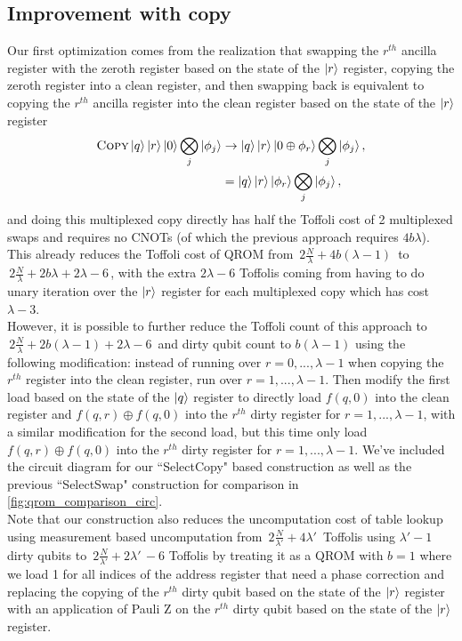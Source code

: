 \documentclass[a4paper, amsfonts, amssymb, amsmath, reprint, showkeys, twoside,superscriptaddress, onecolumn, nofootinbib]{revtex4-2}
\begin{document}
\subsection{Improvement with copy}\label{sec:select_copy}
Our first optimization comes from the realization that swapping the $r^{th}$ ancilla register with the zeroth register based on the state of the $\ket{r}$ register, copying the zeroth register into a clean register, and then swapping back is equivalent to copying the $r^{th}$ ancilla register into the clean register based on the state of the $\ket{r}$ register
\begin{align}
    \textsc{Copy}\ket{q}\ket{r}\ket{0}\bigotimes_j \ket{\phi_j}  &\to \ket{q}\ket{r}\ket{0\oplus\phi_r}\bigotimes_j \ket{\phi_j},\nonumber\\
    &= \ket{q}\ket{r}\ket{\phi_r}\bigotimes_j \ket{\phi_j},
\end{align}
and doing this multiplexed copy directly has half the Toffoli cost of 2 multiplexed swaps and requires no CNOTs (of which the previous approach requires $4b\lambda$). This already reduces the Toffoli cost of QROM from $\,2\frac{N}{\lambda} + 4b(\lambda - 1)\,$ to $\,2\frac{N}{\lambda} + 2b\lambda + 2\lambda - 6\,$, with the extra $2\lambda - 6$ Toffolis coming from having to do unary iteration over the $\ket{r}$ register for each multiplexed copy which has cost $\lambda - 3$.\\

However, it is possible to further reduce the Toffoli count of this approach to $\,2\frac{N}{\lambda} + 2b(\lambda-1) + 2\lambda - 6\,$ and dirty qubit count to $b(\lambda-1)$ using the following modification: instead of running over $r=0,...,\lambda -1$ when copying the $r^{th}$ register into the clean register, run over $r=1,...,\lambda -1$. Then modify the first load based on the state of the $\ket{q}$ register to directly load $f(q,0)$ into the clean register and $f(q,r) \oplus f(q,0)$ into the $r^{th}$ dirty register for $r=1,...,\lambda -1$, with a similar modification for the second load, but this time only load $f(q,r) \oplus f(q,0)$ into the $r^{th}$ dirty register for $r=1,...,\lambda -1$. We've included the circuit diagram for our ``SelectCopy"  based construction as well as the previous ``SelectSwap" construction for comparison in \cref{fig:qrom_comparison_circ}.\\

Note that our construction also reduces the uncomputation cost of table lookup using measurement based uncomputation from $\,2\frac{N}{\lambda'} + 4\lambda'\,$ Toffolis using $\lambda' - 1$ dirty qubits \cite{berry2019qubitization} to  $\,2\frac{N}{\lambda'} + 2\lambda'\, -6$ Toffolis by treating it as a QROM with $b=1$ where we load 1 for all indices of the address register that need a phase correction and replacing the copying of the $r^{th}$ dirty qubit based on the state of the $\ket{r}$ register with an application of Pauli Z on the $r^{th}$ dirty qubit based on the state of the $\ket{r}$ register.\\
\end{document}
